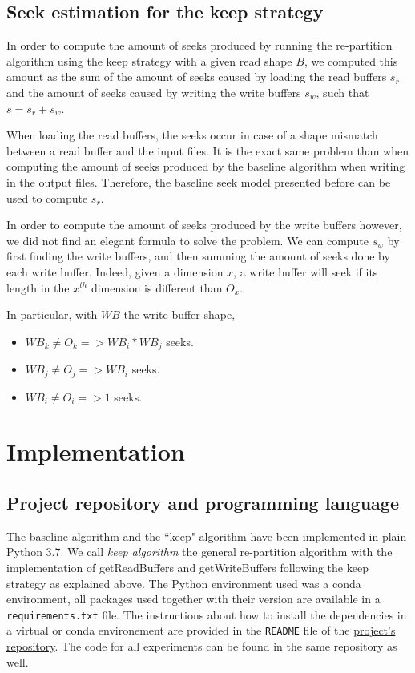 \documentclass[conference]{IEEEtran}
\begin{document}
\subsection{Seek estimation for the keep strategy}

In order to compute the amount of seeks produced by running the re-partition
algorithm using the keep strategy with a given read shape $B$, we computed this
amount as the sum of the amount of seeks caused by loading the read buffers $s_r$
and the amount of seeks caused by writing the write buffers $s_w$,
such that $s=s_r+s_w$.

When loading the read buffers, the seeks occur in case of a shape mismatch
between a read buffer and the input files. It is the exact same problem than
when computing the amount of seeks produced by the baseline algorithm when
writing in the output files. Therefore, the baseline seek model presented
before can be used to compute $s_r$.

In order to compute the amount of seeks produced by the write buffers however,
we did not find an elegant formula to solve the problem. We can compute $s_w$
by first finding the write buffers, and then summing the amount of seeks done
by each write buffer. Indeed, given a dimension $x$, a write buffer will seek
if its length in the $x^{th}$ dimension is different than $O_x$.

In particular, with $WB$ the write buffer shape,
\begin{itemize}
  \item $WB_k \neq O_k => WB_i*WB_j$ seeks.
  \item $WB_j \neq O_j => WB_i$ seeks.
  \item $WB_i \neq O_i => 1$ seeks.
\end{itemize}

\section{Implementation}

\subsection{Project repository and programming language}
The baseline algorithm and the ``keep" algorithm have been implemented in plain
Python 3.7.
We call \emph{keep algorithm} the general re-partition algorithm with the
implementation of getReadBuffers and getWriteBuffers following the keep
strategy as explained above.
The Python environment used was a conda environment, all packages used together
with their version are available in a \texttt{requirements.txt} file.
The instructions about how to install the dependencies in a virtual or conda
environement are provided in the \texttt{README} file of the
\href{https://github.com/GTimothee/repartition_experiments}{project's repository}.
The code for all experiments can be found in the same repository as well.
\end{document}
